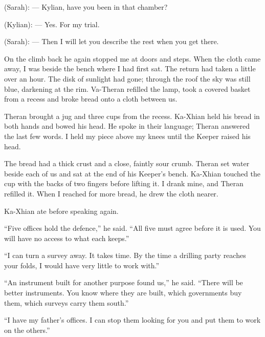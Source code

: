 \begin{room}

(Sarah): --- Kylian, have you been in that chamber?

(Kylian): --- Yes. For my trial.

(Sarah): --- Then I will let you describe the rest when you get there.

\end{room}

On the climb back he again stopped me at doors and steps. When the cloth came away, I was beside the bench where I had first sat. The return had taken a little over an hour. The disk of sunlight had gone; through the roof the sky was still blue, darkening at the rim. Va-Theran refilled the lamp, took a covered basket from a recess and broke bread onto a cloth between us.\par

Theran brought a jug and three cups from the recess. Ka-Xhian held his bread in both hands and bowed his head. He spoke in their language; Theran answered the last few words. I held my piece above my knees until the Keeper raised his head.\par

The bread had a thick crust and a close, faintly sour crumb. Theran set water beside each of us and sat at the end of his Keeper's bench. Ka-Xhian touched the cup with the backs of two fingers before lifting it. I drank mine, and Theran refilled it. When I reached for more bread, he drew the cloth nearer.\par

Ka-Xhian ate before speaking again.\par

``Five offices hold the defence,'' he said. ``All five must agree before it is used. You will have no access to what each keeps.''\par

``I can turn a survey away. It takes time. By the time a drilling party reaches your folds, I would have very little to work with.''\par

``An instrument built for another purpose found us,'' he said. ``There will be better instruments. You know where they are built, which governments buy them, which surveys carry them south.''\par

``I have my father's offices. I can stop them looking for you and put them to work on the others.''\par


